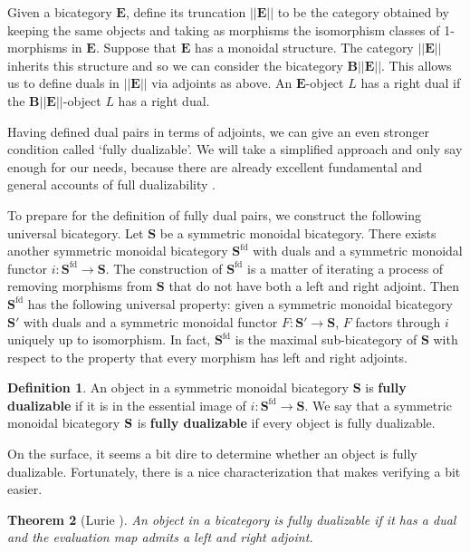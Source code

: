 \documentclass[11pt]{amsart}
\newcommand{\cat}[1]{\mathbf{#1}}
\newcommand{\from}{\colon}
\newtheorem{thm}{Theorem}[section]
\theoremstyle{remark}
\theoremstyle{definition}
\newtheorem{defn}[thm]{Definition}
\begin{document}
Given a bicategory $\cat{E}$, 
define its truncation $|| \cat{E} ||$ to be 
the category obtained by keeping the same objects and 
taking as morphisms the isomorphism classes of 
1-morphisms in $\cat{E}$. 
Suppose that $\cat{E}$ has a monoidal structure. 
The category $|| \cat{E} ||$ inherits this structure and 
so we can consider the bicategory $\cat{B} || \cat{E} ||$. 
This allows us to define duals in $|| \cat{E} ||$ via adjoints as above. 
An $\cat{E}$-object $L$ has a right dual if 
the $\cat{B}|| \cat{E} ||$-object $L$ has a right dual.

Having defined dual pairs in terms of adjoints, 
we can give an even stronger condition 
called `fully dualizable'.  
We will take a simplified approach 
and only say enough for our needs,
because there are already excellent 
fundamental and general accounts 
of full dualizability 
	\cite{Lurie,Piotr}. 

To prepare for the definition of fully dual pairs, 
we construct the following universal bicategory. 
Let $\cat{S}$ be a symmetric monoidal bicategory. 
There exists another symmetric monoidal bicategory 
	$\cat{S}^{\text{fd}}$ 
with duals and a symmetric monoidal functor 
	$i \from \cat{S}^{\text{fd}} \to \cat{S}$.  
The construction of $\cat{S}^{\text{fd}}$ 
is a matter of iterating a process of removing morphisms from 
$\cat{S}$ that do not have both a left and right adjoint. 
Then $\cat{S}^{\text{fd}}$ has the following universal property: 
given a symmetric monoidal bicategory 
	$\cat{S}'$ 
with duals and a symmetric monoidal functor 
	$F \from \cat{S}' \to \cat{S}$, 
$F$ factors through $i$ uniquely up to isomorphism. 
In fact, $\cat{S}^{\text{fd}}$ is 
the maximal sub-bicategory of $\cat{S}$ with respect to 
the property that every morphism has left and right adjoints.  

\begin{defn}
\label{def:FullDual}
	An object in a symmetric monoidal bicategory 
		$\cat{S}$ 
	is \textbf{fully dualizable} if it is in the essential image of 
		$i \from \cat{S}^{\text{fd}} \to \cat{S}$.
	We say that a symmetric monoidal bicategory 
		$\bold{S}$ 
	is \textbf{fully dualizable} if every object is fully dualizable.
\end{defn}  

On the surface, it seems a bit dire to determine 
whether an object is fully dualizable.
Fortunately, there is a nice characterization 
that makes verifying a bit easier.

\begin{thm}[Lurie {\cite[Prop.~4.2.3]{Lurie}}]
	An object in a bicategory is fully dualizable if 
	it has a dual and the evaluation map admits 
	a left and right adjoint.  
\end{thm}
\end{document}
